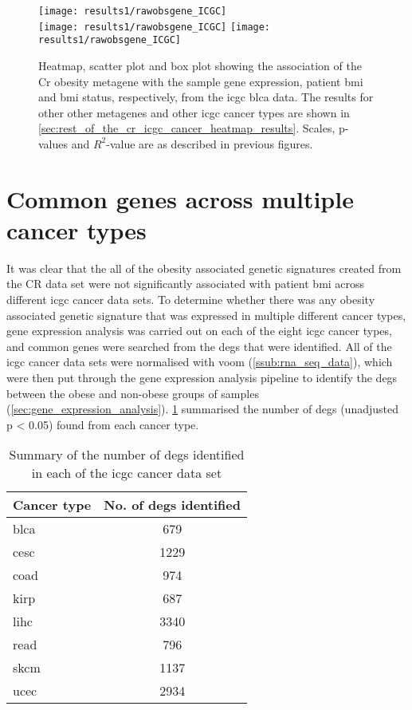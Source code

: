 \begin{figure}[p]
	\centering
	\texttt{[image: results1/rawobsgene\_ICGC]}\\
	\vspace{1em}
	\texttt{[image: results1/rawobsgene\_ICGC]}
	\hfill
	\texttt{[image: results1/rawobsgene\_ICGC]}
	\caption[Cr obesity metagene in the \acrshort{icgc} \acrshort{blca} data]{Heatmap, scatter plot and box plot showing the association of the Cr obesity metagene with the sample gene expression, patient \gls{bmi} and \gls{bmi} status, respectively, from the \acrshort{icgc} \acrshort{blca} data.
	The results for other other metagenes and other \gls{icgc} cancer types are shown in \cref{sec:rest_of_the_cr_icgc_cancer_heatmap_results}.
	Scales, p-values and $R^2$-value are as described in previous figures.}
	\label{fig:degmetaicgc}
\end{figure}

\section{Common genes across multiple cancer types}
\label{sec:common_genes_across_multiple_cancer_types}

It was clear that the all of the obesity associated genetic signatures created from the CR data set were not significantly associated with patient \gls{bmi} across different \gls{icgc} cancer data sets.
To determine whether there was any obesity associated genetic signature that was expressed in multiple different cancer types, gene expression analysis was carried out on each of the eight \gls{icgc} cancer types, and common genes were searched from the \glspl{deg} that were identified.
All of the \gls{icgc} cancer data sets were normalised with voom (\cref{ssub:rna_seq_data}), which were then put through the gene expression analysis pipeline to identify the \glspl{deg} between the obese and non-obese groups of samples (\cref{sec:gene_expression_analysis}).
\cref{tab:icgcdegnum} summarised the number of \glspl{deg}  (unadjusted p \textless{} 0.05) found from each cancer type.

\begin{table}[p]
	\centering
	\caption{Summary of the number of \glspl{deg} identified in each of the \gls{icgc} cancer data set}
	\label{tab:icgcdegnum}
	\begin{tabular}{lc}
		Cancer type & No. of \glspl{deg} identified\\
		\hline
		\hline
		\rule{0pt}{2.25ex}\gls{blca} & 679 \\
		\gls{cesc} & 1229\\
		\gls{coad} & 974\\
		\gls{kirp} & 687\\
		\gls{lihc} & 3340\\
		\gls{read} & 796\\
		\gls{skcm} & 1137\\
		\gls{ucec} & 2934\\
		\hline
		\hline
	\end{tabular}
\end{table}

